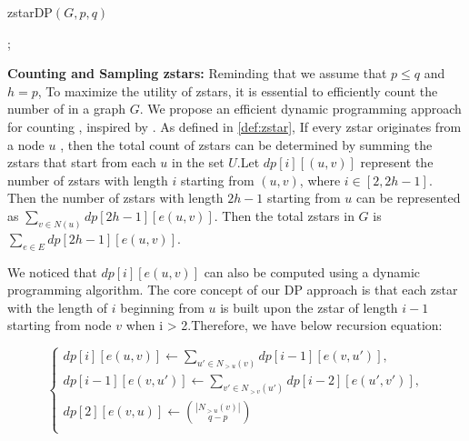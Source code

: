 \begin{algorithm}
	\label{algo:zstardp}
	\DontPrintSemicolon

	\caption{zstarDP$(G, p, q)$}
	\label{algo:zstardp}

	;
\end{algorithm}


\textbf{Counting and Sampling zstars:} Reminding that we assume that $p \leq q$ and $h = p$, To maximize the utility of zstars, it is essential to efficiently count the number of \zstars in a graph $G$. We propose an efficient dynamic programming approach for counting \zstars, inspired by \cite{zigzag} . As defined in \ref{def:zstar}, If every zstar originates from a node $u$ , then the total count of zstars can be determined by summing the zstars that start from each $u$ in the set $U$.Let $dp[i][(u,v)]$ represent the number of zstars with length $i$ starting from $(u, v)$, where $i \in [2,2h-1] $. Then the number of zstars with length $2h-1$ starting from $u$ can be represented as $\sum_{v \in N(u)} dp[2h - 1][e(u, v)]$. Then the total zstars in $G$ is $\sum_{e \in E} dp[2h - 1][e(u, v)]$.

We noticed that $dp[i][e(u, v)]$ can also be computed using a dynamic programming algorithm. The core concept of our DP approach is that each zstar with the length of $i$ beginning from $u$ is built upon the zstar of length $i - 1$ starting from node $v$ when i > 2.Therefore, we have below recursion equation:

\begin{equation}
	\label{dpcount}
	\begin{cases}
		dp[i][e(u, v)] \gets \sum_{u' \in N_{> u}(v)} dp[i - 1][e(v, u')], \\
		dp[i - 1][e(v, u')] \gets \sum_{v' \in N_{> v}(u')} dp[i - 2][e(u', v')], \\
		dp[2][e(v, u)] \gets \binom{|N_{>u}(v)|}{q - p} \\
	\end{cases}
\end{equation}


